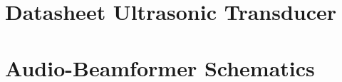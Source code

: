 \section{Datasheet Ultrasonic Transducer} \label{appendix_ma401a6}
\enlargethispage{2.5cm}
\begin{adjustwidth}{-0.23cm}{0cm} \hfuzz=7.0pt \vfuzz=20.0pt
\end{adjustwidth}
\newpage

\section{Audio-Beamformer Schematics} \label{Fleet-Monitor V1.0 Schematics}
\enlargethispage{2.5cm}
\begin{adjustwidth}{0.23cm}{0cm} \hfuzz=7.0pt \vfuzz=20.0pt
\end{adjustwidth}
\newpage

